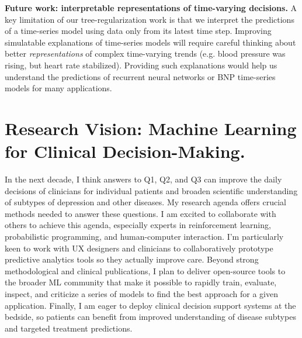 \documentclass[11pt,letterpaper]{article}
\begin{document}
\textbf{Future work: interpretable representations of time-varying decisions.}
A key limitation of our tree-regularization work is that we interpret the predictions of a time-series model using data only from its latest time step. Improving simulatable explanations of time-series models will require careful thinking about better \emph{representations} of complex time-varying trends (e.g. blood pressure was rising, but heart rate stabilized). Providing such explanations would help us understand the predictions of recurrent neural networks or BNP time-series models
for many applications.

\section*{Research Vision: Machine Learning for Clinical Decision-Making.}


In the next decade, I think answers to Q1, Q2, and Q3 can improve the daily decisions of clinicians for individual patients and broaden scientific understanding of subtypes of depression and other diseases.
My research agenda offers crucial methods needed to answer these questions.
I am excited to collaborate with others to achieve this agenda, especially experts in reinforcement learning,   probabilistic programming, and human-computer interaction.
I'm particularly keen to work 
with UX designers and clinicians to collaboratively prototype predictive analytics tools so they actually improve care.
Beyond strong methodological and clinical publications, 
I plan to deliver open-source tools to the broader ML community that make it possible to rapidly train, evaluate, inspect, and criticize a series of models to find the best approach for a given application. Finally, I am eager to deploy clinical decision support systems at the bedside, so patients can benefit from improved understanding of disease subtypes and targeted treatment predictions.




\renewcommand{\url}[1]
{\ifx#1\else\href{#1}{[PDF]}\fi}
{\scriptsize
\setlength{\bibsep}{1pt}

}
\end{document}
